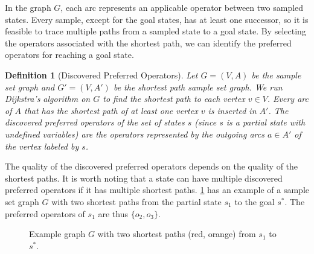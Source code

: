 \documentclass[ppgc,diss,english]{iiufrgs}
\newtheorem{definition}{Definition}
\begin{document}
In the graph $G$, each arc represents an applicable operator between two sampled states. Every sample, except for the goal states, has at least one successor, so it is feasible to trace multiple paths from a sampled state to a goal state. By selecting the operators associated with the shortest path, we can identify the preferred operators for reaching a goal state.

\begin{definition}[Discovered Preferred Operators]\label{def:discovered_preferred_operators}
Let $G = (V, A)$ be the sample set graph and $G' = (V, A')$ be the shortest path sample set graph. We run Dijkstra's algorithm on $G$ to find the shortest path to each vertex $v \in V$. Every arc of $A$ that has the shortest path of at least one vertex $v$ is inserted in $A'$. The discovered preferred operators of the set of states $s$ (since $s$ is a partial state with undefined variables) are the operators represented by the outgoing arcs $a \in A'$ of the vertex labeled by $s$.
\end{definition}

The quality of the discovered preferred operators depends on the quality of the shortest paths. It is worth noting that a state can have multiple discovered preferred operators if it has multiple shortest paths. \cref{fig:spg-example} has an example of a sample set graph $G$ with two shortest paths from the partial state $s_{1}$ to the goal $s^{*}$. The preferred operators of $s_{1}$ are thus $\{o_{2}, o_{3}\}$.

\begin{figure}[ht]
\caption[Example graph $G'$ with two shortest paths]{Example graph $G$ with two shortest paths (red, orange) from $s_{1}$ to $s^{*}$.}
\centering
{}
\label{fig:spg-example}
\end{figure}
\end{document}
